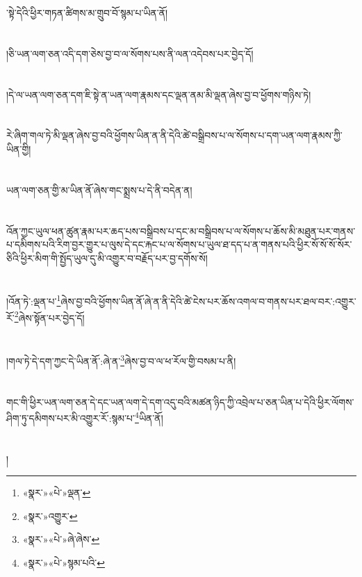 ་སྟེ་དེའི་ཕྱིར་གཏན་ཚིགས་མ་གྲུབ་བོ་སྙམ་པ་ཡིན་ནོ།\chapter{ }།ཅི་ཡན་ལག་ཅན་འདི་དག་ཅེས་བྱ་བ་ལ་སོགས་པས་ནི་ལན་འདེབས་པར་བྱེད་དོ།\chapter{ }།དེ་ལ་ཡན་ལག་ཅན་དག་ཇི་སྟེ་ན་ཡན་ལག་རྣམས་དང་ལྡན་ནམ་མི་ལྡན་ཞེས་བྱ་བ་ཕྱོགས་གཉིས་ཏེ།\chapter{ }རེ་ཞིག་གལ་ཏེ་མི་ལྡན་ཞེས་བྱ་བའི་ཕྱོགས་ཡིན་ན་ནི་དེའི་ཚེ་བསྒྲིབས་པ་ལ་སོགས་པ་དག་ཡན་ལག་རྣམས་ཀྱི་ཡིན་གྱི།\chapter{ }ཡན་ལག་ཅན་གྱི་མ་ཡིན་ནོ་ཞེས་གང་སྨྲས་པ་དེ་ནི་བདེན་ན།\chapter{ }འོན་ཀྱང་ཡུལ་ཕན་ཚུན་རྣམ་པར་ཆད་པས་བསྒྲིབས་པ་དང་མ་བསྒྲིབས་པ་ལ་སོགས་པ་ཆོས་མི་མཐུན་པར་གནས་པ་དམིགས་པའི་རིག་བྱར་གྱུར་པ་ལུས་དེ་དང་རྐང་པ་ལ་སོགས་པ་ཡུལ་ཐ་དད་པ་ན་གནས་པའི་ཕྱིར་སོ་སོ་སོ་སོར་ཅིའི་ཕྱིར་མིག་གི་སྤྱོད་ཡུལ་དུ་མི་འགྱུར་བ་བརྗོད་པར་བྱ་དགོས་སོ།\chapter{ }།འོན་ཏེ་:ལྡན་པ་\footnote{«སྣར་»«པེ་»ལྡན་}ཞེས་བྱ་བའི་ཕྱོགས་ཡིན་ནོ་ཞེ་ན་ནི་དེའི་ཚེ་ངེས་པར་ཆོས་འགལ་བ་གནས་པར་ཐལ་བར་:འགྱུར་རོ་\footnote{«སྣར་»འགྱུར་}ཞེས་སྟོན་པར་བྱེད་དོ།\chapter{ }།གལ་ཏེ་དེ་དག་ཀྱང་དེ་ཡིན་ནོ་:ཞེ་ན་\footnote{«སྣར་»«པེ་»ཞེ་ཞེས་}ཞེས་བྱ་བ་ལ་ཕ་རོལ་གྱི་བསམ་པ་ནི།\chapter{ }གང་གི་ཕྱིར་ཡན་ལག་ཅན་དེ་དང་ཡན་ལག་དེ་དག་འདུ་བའི་མཚན་ཉིད་ཀྱི་འབྲེལ་པ་ཅན་ཡིན་པ་དེའི་ཕྱིར་ལོགས་ཤིག་ཏུ་དམིགས་པར་མི་འགྱུར་རོ་:སྙམ་པ་\footnote{«སྣར་»«པེ་»སྙམ་པའི་}ཡིན་ནོ།\chapter{ }།
